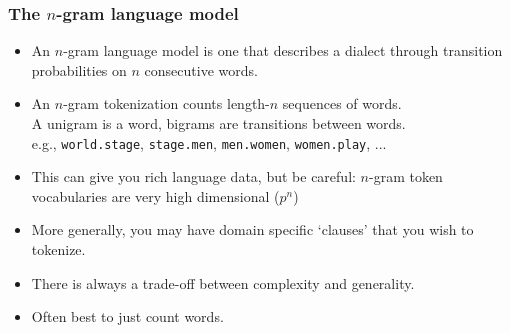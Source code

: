 \documentclass[
  shownotes,
  xcolor={svgnames},
  hyperref={colorlinks,citecolor=DarkBlue,linkcolor=DarkRed,urlcolor=DarkBlue}
  , aspectratio=169]{beamer}
\newcommand{\theme}{\color{andesred}}
\newcommand{\gr}{\color{black!60}}
\newcommand{\sg}{\color{DarkSlateGray}}
\begin{document}
\begin{frame}[fragile]
\frametitle{The $n$-gram language model}

\begin{itemize}



\item An $n$-gram language model is one that describes a dialect through transition probabilities on $n$ consecutive words.

\medskip

\item An {\theme $n$-gram tokenization} counts length-$n$ sequences of words.\\
{\sg A unigram is a word, bigrams are transitions between words.}\\
{\gr e.g., {\tt world.stage}, {\tt stage.men}, {\tt men.women}, {\tt women.play}, ...}

\medskip

\item This can give you rich language data, but be careful: $n$-gram token vocabularies are very high dimensional ($p^n$)
\medskip
\item  More generally, you may have domain specific `clauses' that you wish to tokenize.
\medskip
\item  There is always a trade-off between complexity and generality. 
\medskip
\item {\theme Often best to just count words.}

\end{itemize}

\end{frame}
\end{document}

